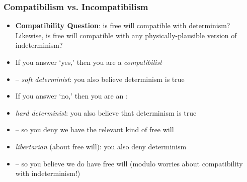 \begin{frame}
\frametitle{Compatibilism vs. Incompatibilism}

\begin{itemize}[<+->]

\item \textbf{Compatibility Question}: is free will compatible with determinism? Likewise, is free will compatible with any physically-plausible version of indeterminism?

\item If you answer `yes,' then you are a \emph{compatibilist}
\item[] -- \textit{soft determinist}: you also believe determinism is true 

\item If you answer `no,' then you are an : 

\item \textit{hard determinist}: you also believe that determinism is true
\item[] -- so you deny we have the relevant kind of free will

\item \textit{libertarian} (about free will): you also deny determinism
\item[] -- so you believe we do have free will (modulo worries about compatibility with indeterminism!)

\end{itemize}
\end{frame}

